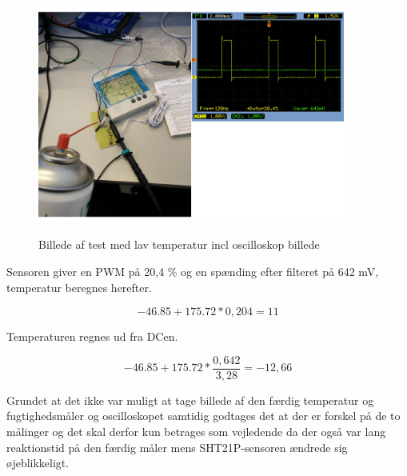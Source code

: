 \begin{figure}[h]
\centering
{\includegraphics[width=0.90\textwidth]{filer/modultest/Billeder/test_kold}}
\caption{Billede af test med lav temperatur incl oscilloskop billede}
\label{lab:test_kold}
\end{figure}

Sensoren giver en PWM på 20,4 \% og en spænding efter filteret på 642 mV, temperatur beregnes herefter.


\begin{equation}
-46.85+175.72*0,204=11
\end{equation}

Temperaturen regnes ud fra DCen. 

\begin{equation}
-46.85+175.72*\frac{0,642}{3,28}=-12,66
\end{equation}

Grundet at det ikke var muligt at tage billede af den færdig temperatur og fugtighedsmåler og oscilloskopet samtidig godtages det at der er forskel på de to målinger og det skal derfor kun betrages som vejledende da der også var lang reaktionstid på den færdig måler mens SHT21P-sensoren ændrede sig øjeblikkeligt.
